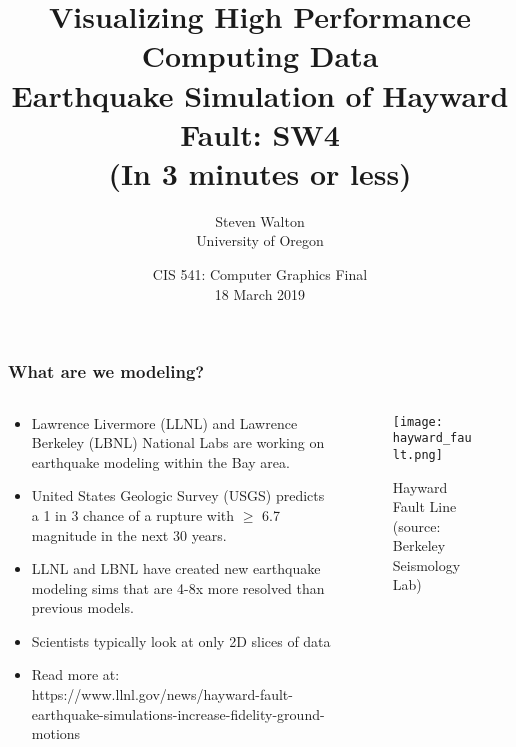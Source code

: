 \documentclass[pdf,8pt]{beamer}
\title{Visualizing High Performance Computing Data\\
    \large{Earthquake Simulation of Hayward Fault: SW4}\\
        \tiny{(In 3 minutes or less)}}
\author{Steven Walton\\
        \small University of Oregon}
\date{CIS 541: Computer Graphics Final \\18 March 2019}
\begin{document}
\frame{\titlepage}

\begin{frame}
\frametitle{What are we modeling?}

\begin{columns}
    \begin{column}{0.49\paperwidth}
    \begin{itemize}
    \item Lawrence Livermore (LLNL) and Lawrence Berkeley (LBNL) National Labs are working
          on earthquake modeling within the Bay area. 
    \item United States Geologic Survey (USGS) predicts a 1 in 3 chance of a rupture
          with $\geq$ 6.7 magnitude in the next 30 years.
    \item LLNL and LBNL have created new earthquake modeling sims that are 4-8x
          more resolved than previous models.
    \item Scientists typically look at only 2D slices of data
    \item<2> Read more at: https://www.llnl.gov/news/hayward-fault-earthquake-simulations-increase-fidelity-ground-motions
    \end{itemize}
    \end{column}

    \begin{column}{0.49\paperwidth}
    \begin{figure}[ht]
        \vspace{-4em}
        \begin{center}
            \texttt{[image: hayward\_fault.png]}
            \caption{Hayward Fault Line (source: Berkeley Seismology Lab)}
        \end{center}
    \end{figure}
    \end{column}
\end{columns}
\end{frame}
\end{document}

